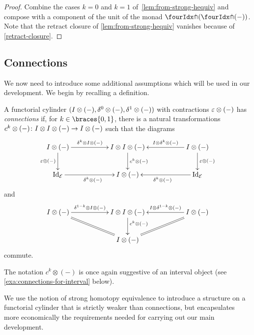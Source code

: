 \documentclass[reqno,10pt,a4paper,oneside,draft]{amsart}
\begin{document}
\begin{proof} Combine the cases $k = 0$ and $k = 1$ of~\cref{lem:from-strong-hequiv} and compose
with  a component of the unit of the monad $\liftl{(\liftr{(-)})}$.  Note that the retract closure of \cref{lem:from-strong-hequiv} vanishes because of \cref{retract-closure}.
\end{proof} 


\subsection*{Connections} We now need to introduce some additional assumptions
which will be used in our development. We begin by recalling a definition.

\begin{definition} \label{def:connections}
A functorial cylinder $(I \otimes (-), \delta^0 \otimes (-), \delta^1 \otimes (-))$ with contractions $\varepsilon \otimes (-)$ has \emph{connections} if, for $k \in \braces{0, 1}$, there is a natural transformations $c^k \otimes (-) \colon I \otimes I \otimes (-) \to I \otimes (-)$ such that the diagrams
\begin{equation} \label{connections:0}
\xymatrix@C+3em{
  \interval \otimes (-)
  \ar[r]^-{\kcyl \otimes \interval \otimes (-)}
  \ar[d]_{\ccyl \otimes (-)}
&
  \interval \otimes \interval \otimes (-)
  \ar[d]^{c^k \otimes (-)}
&
  \interval \otimes (-)
  \ar[l]_-{\interval \otimes \kcyl \otimes (-)}
  \ar[d]^{\ccyl \otimes (-)}
\\
  \Id_\catE
  \ar[r]_{\kcyl \otimes (-)}
&
  \interval \otimes (-)
&
  \Id_\catE
  \ar[l]^{\kcyl \otimes (-)}
}
\end{equation}
and
\begin{equation} \label{connections:1}
\xymatrix@C+3em{
  \interval \otimes (-)
  \ar[r]^-{\kcylinv \otimes \interval \otimes (-)}
  \ar@{=}[dr]
&
  \interval \otimes \interval \otimes (-)
  \ar[d]^(0.4){c^k \otimes (-)}
&
  \interval \otimes (-)
  \ar[l]_-{\interval \otimes \kcylinv \otimes (-)}
  \ar@{=}[dl]
\\&
  \interval \otimes (-)
}
\end{equation}
commute.
\end{definition}

The notation $c^k \otimes (-)$ is once again suggestive of an interval object (see \cref{exa:connections-for-interval} below).

We use the notion of strong homotopy equivalence to introduce a structure on a functorial cylinder that is strictly weaker than connections, but encapsulates more economically the requirements needed for carrying out our main development.
\end{document}
